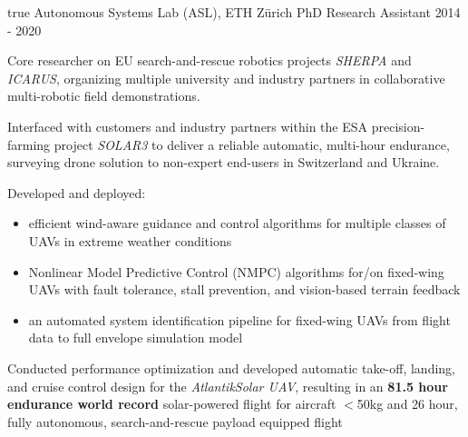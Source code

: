 \begin{cventries}
{    } %
    {} %
    {true}
    {}
%
\cvexpentry
  	{Autonomous Systems Lab (ASL), ETH Z\"{u}rich} %
  	{PhD Research Assistant} %
    {} %
    {2014 - 2020} %
    {
      \begin{cvitems} %
      	\item Core researcher on EU search-and-rescue robotics projects \emph{SHERPA} and \emph{ICARUS}, organizing multiple university and industry partners in collaborative multi-robotic field demonstrations. 
		\item Interfaced with customers and industry partners within the ESA precision-farming project \emph{SOLAR3} to deliver a reliable automatic, multi-hour endurance, surveying drone solution to non-expert end-users in Switzerland and Ukraine.      	
      	\item Developed and deployed:
      	\begin{itemize}
      		\item efficient wind-aware guidance and control algorithms for multiple classes of UAVs in extreme weather conditions
      		\item Nonlinear Model Predictive Control (NMPC) algorithms for/on fixed-wing UAVs with fault tolerance, stall prevention, and vision-based terrain feedback
      		\item an automated system identification pipeline for fixed-wing UAVs from flight data to full envelope simulation model
      	\end{itemize}
      	\item Conducted performance optimization and developed automatic take-off, landing, and cruise control design for the \emph{AtlantikSolar UAV}, resulting in an \textbf{81.5 hour endurance world record} solar-powered flight for aircraft $<$50kg  and 26 hour, fully autonomous, search-and-rescue payload equipped flight 
      \end{cvitems}
    } %

\end{cventries}
